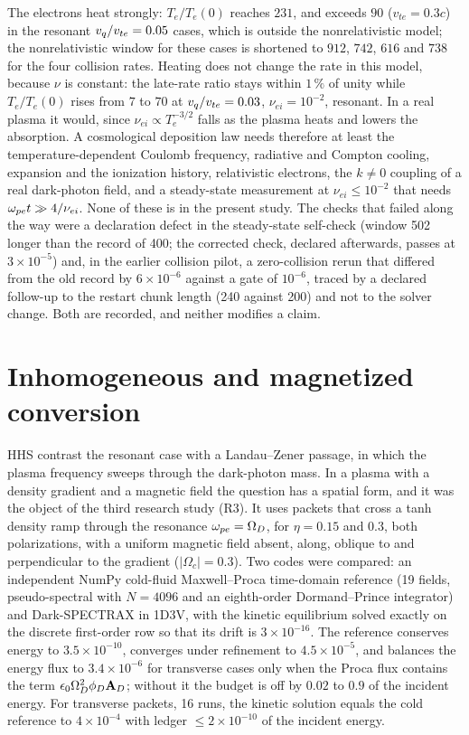 The electrons heat strongly: $T_e/T_e(0)$ reaches $231$, and exceeds $90$ ($v_{te}=0.3c$) in the resonant $v_q/v_{te}=0.05$ cases, which is outside the nonrelativistic model; the nonrelativistic window for these cases is shortened to $912$, $742$, $616$ and $738$ for the four collision rates. Heating does not change the rate in this model, because $\nu$ is constant: the late-rate ratio stays within $1\,\%$ of unity while $T_e/T_e(0)$ rises from $7$ to $70$ at $v_q/v_{te}=0.03$, $\nu_{ei}=10^{-2}$, resonant. In a real plasma it would, since $\nu_{ei}\propto T_e^{-3/2}$ falls as the plasma heats and lowers the absorption. A cosmological deposition law needs therefore at least the temperature-dependent Coulomb frequency, radiative and Compton cooling, expansion and the ionization history, relativistic electrons, the $k\neq0$ coupling of a real dark-photon field, and a steady-state measurement at $\nu_{ei}\le10^{-2}$ that needs $\omega_{pe} t\gg4/\nu_{ei}$. None of these is in the present study. The checks that failed along the way were a declaration defect in the steady-state self-check (window 502 longer than the record of 400; the corrected check, declared afterwards, passes at $3\times10^{-5}$) and, in the earlier collision pilot, a zero-collision rerun that differed from the old record by $6\times10^{-6}$ against a gate of $10^{-6}$, traced by a declared follow-up to the restart chunk length (240 against 200) and not to the solver change. Both are recorded, and neither modifies a claim.

\section{Inhomogeneous and magnetized conversion}\label{sec:c9-r3}

HHS contrast the resonant case with a Landau--Zener passage, in which the plasma frequency sweeps through the dark-photon mass. In a plasma with a density gradient and a magnetic field the question has a spatial form, and it was the object of the third research study (R3). It uses packets that cross a tanh density ramp through the resonance $\omega_{pe}=\Omega_D$, for $\eta=0.15$ and $0.3$, both polarizations, with a uniform magnetic field absent, along, oblique to and perpendicular to the gradient ($|\Omega_c|=0.3$). Two codes were compared: an independent NumPy cold-fluid Maxwell--Proca time-domain reference (19 fields, pseudo-spectral with $N=4096$ and an eighth-order Dormand--Prince integrator) and Dark-SPECTRAX in 1D3V, with the kinetic equilibrium solved exactly on the discrete first-order row so that its drift is $3\times10^{-16}$. The reference conserves energy to $3.5\times10^{-10}$, converges under refinement to $4.5\times10^{-5}$, and balances the energy flux to $3.4\times10^{-6}$ for transverse cases only when the Proca flux contains the term $\epsilon_0\Omega_D^2\phi_D\mathbf A_D$; without it the budget is off by $0.02$ to $0.9$ of the incident energy. For transverse packets, 16 runs, the kinetic solution equals the cold reference to $4\times10^{-4}$ with ledger $\le2\times10^{-10}$ of the incident energy.


